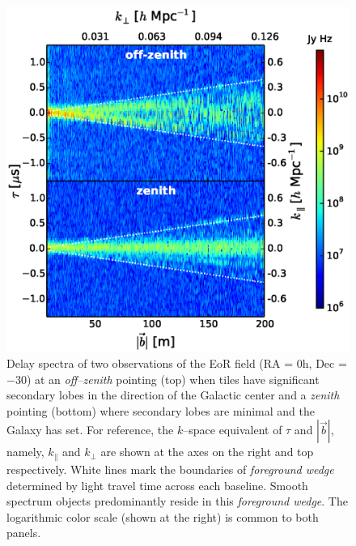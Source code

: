 \documentclass[preprint2,iop,numberedappendix]{emulateapj}
\begin{document}
\begin{figure}[htb]
\centering
\includegraphics[width=\linewidth]{figures/v1_0/multi_baseline_fhd_delay_spectrum_snapshots.eps}
\caption{Delay spectra of two observations of the EoR field (RA = 0h, Dec = $-30$\arcdeg) at an {\it off--zenith} pointing (top) when tiles have significant secondary lobes in the direction of the Galactic center and a {\it zenith} pointing (bottom) where secondary lobes are minimal and the Galaxy has set. For reference, the $k$--space equivalent of $\tau$ and $|\vec{b}|$, namely, $k_\parallel$ and $k_\perp$ are shown at the axes on the right and top respectively. White lines mark the boundaries of {\it foreground wedge} determined by light travel time across each baseline. Smooth spectrum objects predominantly reside in this {\it foreground wedge}. The logarithmic color scale (shown at the right) is common to both panels. \label{fig:fhd_data}}
\end{figure}

\end{document}

